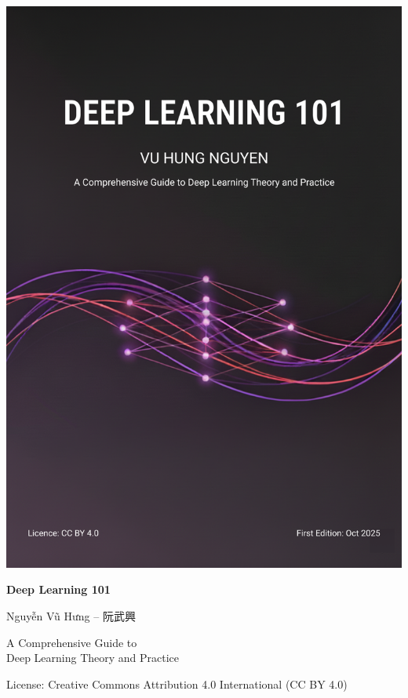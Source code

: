 \documentclass[10pt,\papersize,twoside,openright]{book}
\theoremstyle{definition}
\theoremstyle{remark}
\begin{document}
{{{{{{{{                \includegraphics[width=\paperwidth,height=\paperheight]{images/DeepLearning101-cover-A5.png}%
              }%
            }%
          }%
        }%
      }%
    }%
  }%
}
\mbox{}%
\endgroup %
\clearpage

\begin{titlepage}
\thispagestyle{empty}
\centering
\vspace*{\fill}

{\Huge\bfseries Deep Learning 101\par}
\vspace{2cm}

{\Large Nguyễn Vũ Hưng -- 阮武興 \par}
\vspace{2cm}

{\large A Comprehensive Guide to\\
Deep Learning Theory and Practice\par}

\vspace{3cm}

{\large \DTMtoday\par}
\vspace{1cm}

{\small License: Creative Commons Attribution 4.0 International (CC BY 4.0)\par}

\vspace*{\fill}
\end{titlepage}
\end{document}
